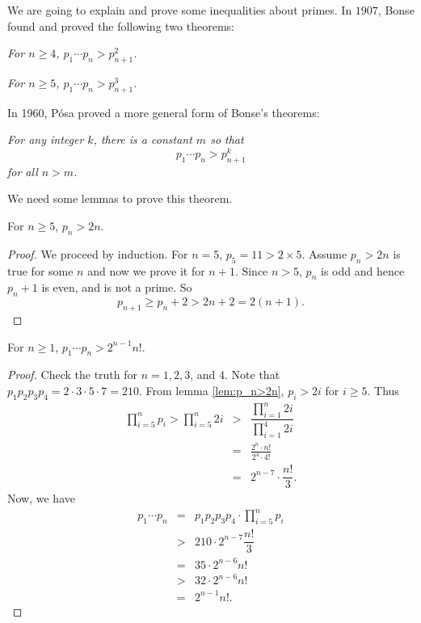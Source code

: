 \documentclass{subfiles}
\begin{document}
	We are going to explain and prove some inequalities about primes. In $1907$, Bonse found and proved the following two theorems:
	\begin{theorem}\sl
		For $n\geq 4$, $p_1\cdots p_n>p_{n+1}^2$.\label{thm:bonse1}
	\end{theorem}
	
	\begin{theorem}\sl
		For $n \geq 5$, $p_1\cdots p_n>p_{n+1}^3$.\label{thm:bonse2}
	\end{theorem}
	
	In 1960, P\'{o}sa proved a more general form of Bonse's theorems:
	
	\begin{theorem}\sl
		\label{thm:posa}
		For any integer $k$, there is a constant $m$ so that \[p_1\cdots p_n>p_{n+1}^k\]
		for all $n>m$.
	\end{theorem}
	
	We need some lemmas to prove this theorem.
	
	\begin{lemma}
		For $n\geq 5$, $p_n>2n$.\label{lem:p_n>2n}
	\end{lemma}
	
	\begin{proof}
		We proceed by induction. For $n=5$, $p_5=11>2 \times 5$. Assume $p_n >2n$ is true for some $n$ and now we prove it for $n+1$. Since $n>5$, $p_n$ is odd and hence $p_n+1$ is even, and is not a prime. So
		\[p_{n+1}\geq p_n+2>2n+2=2(n+1).\]
	\end{proof}
	
	\begin{lemma}
		For $n\geq1$, $p_1\cdots p_n> 2^{n-1}n!$.\label{lem:p_1p_2...p_n>2^{n-1}n!}
	\end{lemma}
	
	\begin{proof}
		Check the truth for $n=1,2,3$, and $4$. Note that $p_1p_2p_3p_4=2\cdot3\cdot5\cdot7=210$. From lemma \eqref{lem:p_n>2n}, $p_i>2i$ for $i\geq5$. Thus
		\begin{eqnarray*}
			\prod_{i=5}^np_i > \prod_{i=5}^n2i & > & \dfrac{\prod_{i=1}^n 2i}{\prod_{i=1}^4 2i}\\
			& = & \frac{2^n \cdot n!}{2^4\cdot 4!}\\
			& = & 2^{n-7}\cdot \dfrac{n!}{3}.
		\end{eqnarray*}
		Now, we have
		\begin{eqnarray*}
			p_1\cdots p_n & = & p_1p_2p_3p_4\cdot \prod_{i=5}^np_i \\
			& > & 210\cdot2^{n-7}\dfrac{n!}{3}\\
			& = & 35 \cdot2^{n-6}n!\\
			& > & 32 \cdot 2^{n-6}n!\\
			& = & 2^{n-1}n!.
		\end{eqnarray*}
	\end{proof}
	
\end{document}
